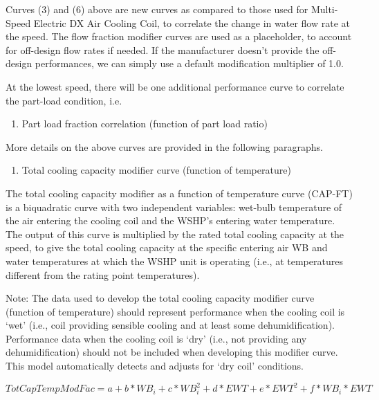 Curves (3) and (6) above are new curves as compared to those used for Multi-Speed Electric DX Air Cooling Coil, to correlate the change in water flow rate at the speed. The flow fraction modifier curves are used as a placeholder, to account for off-design flow rates if needed. If the manufacturer doesn't provide the off-design performances, we can simply use a default modification multiplier of 1.0.

At the lowest speed, there will be one additional performance curve to correlate the part-load condition, i.e.

\begin{enumerate}
\def\labelenumi{\arabic{enumi})}
\setcounter{enumi}{7}
\item Part load fraction correlation (function of part load ratio)
\end{enumerate}

More details on the above curves are provided in the following paragraphs.

\begin{enumerate}
\def\labelenumi{\arabic{enumi})}
\item Total cooling capacity modifier curve (function of temperature)
\end{enumerate}

The total cooling capacity modifier as a function of temperature curve (CAP-FT) is a biquadratic curve with two independent variables: wet-bulb temperature of the air entering the cooling coil and the WSHP's entering water temperature. The output of this curve is multiplied by the rated total cooling capacity at the speed, to give the total cooling capacity at the specific entering air WB and water temperatures at which the WSHP unit is operating (i.e., at temperatures different from the rating point temperatures).

Note: The data used to develop the total cooling capacity modifier curve (function of temperature) should represent performance when the cooling coil is `wet' (i.e., coil providing sensible cooling and at least some dehumidification). Performance data when the cooling coil is `dry' (i.e., not providing any dehumidification) should not be included when developing this modifier curve. This model automatically detects and adjusts for `dry coil' conditions.

\begin{equation}
TotCapTempModFac = a + b*W{B_i} + c*WB_i^2 + d*EWT + e*EW{T^2} + f*W{B_i}*EWT
\end{equation}

